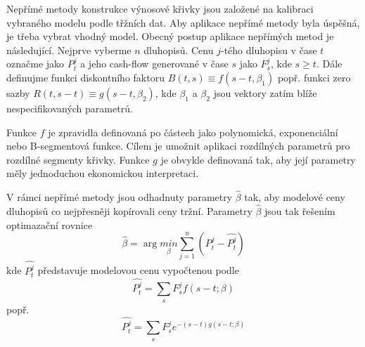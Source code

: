 \documentclass[a4paper]{book}
\begin{document}
Nepřímé metody konstrukce výnosové křivky jsou založené na kalibraci vybraného modelu podle třžních dat. Aby aplikace nepřímé metody byla úspěšná, je třeba vybrat vhodný model. Obecný postup aplikace nepřímých metod je následující. Nejprve vyberme $n$ dluhopisů. Cenu $j$-tého dluhopisu v čase $t$ označme jako $P_t^j$ a jeho cash-flow generované v čase $s$ jako $F_s^j$, kde $s \ge t$. Dále definujme funkci diskontního faktoru $B(t,s) \equiv f(s - t, \beta_1)$ popř. funkci zero sazby $R(t,s - t) \equiv g(s - t, \beta_2)$, kde $\beta_1$ a $\beta_2$ jsou vektory zatím blíže nespecifikovaných parametrů.

Funkce $f$ je zpravidla definovaná po částech jako polynomická, exponenciální nebo B-segmentová funkce. Cílem je umožnit aplikaci rozdílných parametrů pro rozdílné segmenty křivky. Funkce $g$ je obvykle definovaná tak, aby její parametry měly jednoduchou ekonomickou interpretaci.

V rámci nepřímé metody jsou odhadnuty parametry $\hat{\beta}$ tak, aby modelové ceny dluhopisů co nejpřesněji kopírovali ceny tržní. Parametry $\hat{\beta}$ jsou tak řešením optimazační rovnice
\begin{equation}
\hat{\beta} = \arg \underset{\beta}{min} \sum_{j = 1}^n (P_t^j - \hat{P_t^j})
\end{equation}
kde $\hat{P_t^j}$ představuje modelovou cenu vypočtenou podle
\begin{equation*}
\hat{P_t^j} = \sum_s F_s^j f(s - t; \beta)
\end{equation*}
popř.
\begin{equation*}
\hat{P_t^j} = \sum_s F_s^j e^{-(s - t)g(s - t; \beta)}
\end{equation*}
\end{document}
